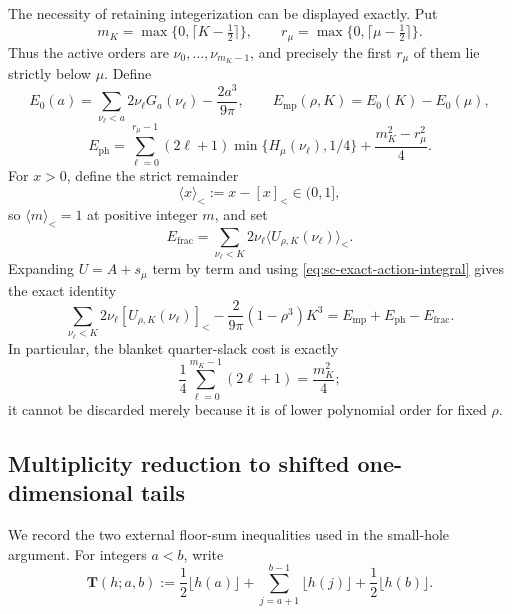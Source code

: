 \documentclass[11pt]{article}
\numberwithin{equation}{section}
\theoremstyle{definition}
\theoremstyle{remark}
\begin{document}
The necessity of retaining integerization can be displayed exactly.  Put
\[
  m_K=\max\{0,\lceil K-\tfrac12\rceil\},
  \qquad
  r_\mu=\max\{0,\lceil\mu-\tfrac12\rceil\}.
\]
Thus the active orders are \(\nu_0,\ldots,\nu_{m_K-1}\), and precisely the
first \(r_\mu\) of them lie strictly below \(\mu\).  Define
\[
  E_0(a)=\sum_{\nu_\ell<a}2\nu_\ell G_a(\nu_\ell)
  -\frac{2a^3}{9\pi},
  \qquad
  E_{\mathrm{mp}}(\rho,K)=E_0(K)-E_0(\mu),
\]
\[
  E_{\mathrm{ph}}
  =\sum_{\ell=0}^{r_\mu-1}(2\ell+1)
  \min\{H_\mu(\nu_\ell),1/4\}
  +\frac{m_K^2-r_\mu^2}{4}.
\]
For \(x>0\), define the strict remainder
\[
  \langle x\rangle_<:=x-[x]_<\in(0,1],
\]
so \(\langle m\rangle_<=1\) at positive integer \(m\), and set
\[
  E_{\mathrm{frac}}
  =\sum_{\nu_\ell<K}2\nu_\ell
  \langle U_{\rho,K}(\nu_\ell)\rangle_<.
\]
Expanding \(U=A+s_\mu\) term by term and using
\eqref{eq:sc-exact-action-integral} gives the exact identity
\begin{equation}
  \sum_{\nu_\ell<K}2\nu_\ell[U_{\rho,K}(\nu_\ell)]_<
  -\frac{2}{9\pi}(1-\rho^3)K^3
  =E_{\mathrm{mp}}+E_{\mathrm{ph}}-E_{\mathrm{frac}}.
  \label{eq:sc-fractional-budget}
\end{equation}
In particular, the blanket quarter-slack cost is exactly
\[
  \frac14\sum_{\ell=0}^{m_K-1}(2\ell+1)=\frac{m_K^2}{4};
\]
it cannot be discarded merely because it is of lower polynomial order for
fixed \(\rho\).

\iffalse
\subsection{Multiplicity reduction to shifted one-dimensional tails}

We record the two external floor-sum inequalities used in the small-hole
argument.  For integers \(a<b\), write
\begin{equation}
  \mathbf T(h;a,b)
  :=\frac12\lfloor h(a)\rfloor
  +\sum_{j=a+1}^{b-1}\lfloor h(j)\rfloor
  +\frac12\lfloor h(b)\rfloor.
  \label{eq:sc-trapezoidal-floor}
\end{equation}
\end{document}
